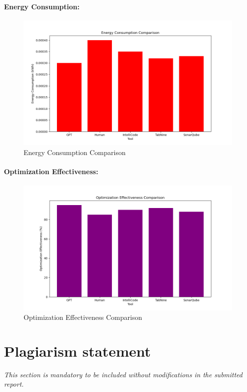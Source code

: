 \documentclass[conference,compsoc]{IEEEtran}
\begin{document}
\paragraph{Energy Consumption:}
\begin{figure}[H]
	\centering
	\includegraphics[width=0.8\linewidth]{figures/energy_consumption_comparison.png}
	\caption{Energy Consumption Comparison}
	\label{fig:energy_consumption_comparison}
\end{figure}

\paragraph{Optimization Effectiveness:}
\begin{figure}[H]
	\centering
	\includegraphics[width=0.8\linewidth]{figures/optimization_effectiveness_comparison.png}
	\caption{Optimization Effectiveness Comparison}
	\label{fig:optimization_effectiveness_comparison}
\end{figure}

\section*{Plagiarism statement}
 {\it This section is mandatory to be included without modifications in the submitted report.}\\
\end{document}
